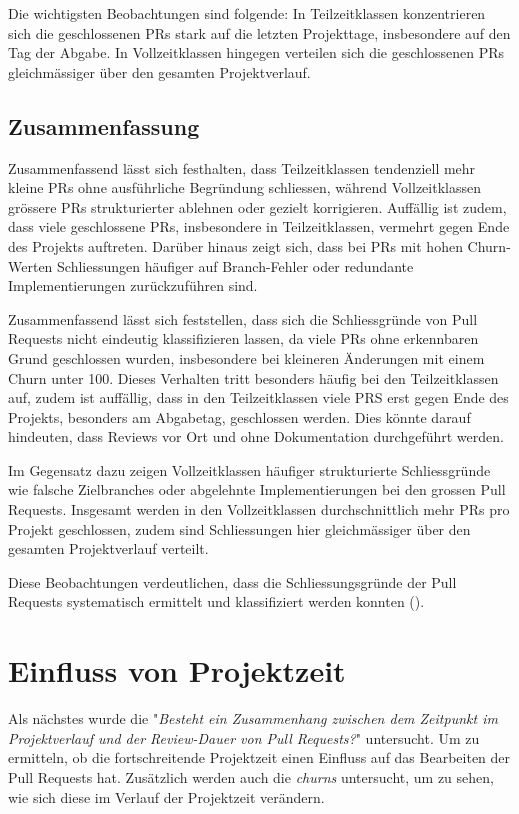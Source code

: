 Die wichtigsten Beobachtungen sind folgende: In Teilzeitklassen konzentrieren sich die geschlossenen PRs stark auf die letzten Projekttage, insbesondere auf den Tag der Abgabe. In Vollzeitklassen hingegen verteilen sich die geschlossenen PRs gleichmässiger über den gesamten Projektverlauf.


\subsection{Zusammenfassung}

Zusammenfassend lässt sich festhalten, dass Teilzeitklassen tendenziell mehr kleine PRs ohne ausführliche Begründung schliessen, während Vollzeitklassen grössere PRs strukturierter ablehnen oder gezielt korrigieren. Auffällig ist zudem, dass viele geschlossene PRs, insbesondere in Teilzeitklassen, vermehrt gegen Ende des Projekts auftreten. Darüber hinaus zeigt sich, dass bei PRs mit hohen Churn-Werten Schliessungen häufiger auf Branch-Fehler oder redundante Implementierungen zurückzuführen sind.

Zusammenfassend lässt sich feststellen, dass sich die Schliessgründe von Pull Requests nicht eindeutig klassifizieren lassen, da viele PRs ohne erkennbaren Grund geschlossen wurden, insbesondere bei kleineren Änderungen mit einem Churn unter 100. Dieses Verhalten tritt besonders häufig bei den Teilzeitklassen auf, zudem ist auffällig, dass in den Teilzeitklassen viele PRS  erst gegen Ende des Projekts, besonders am Abgabetag, geschlossen werden. Dies könnte darauf hindeuten, dass Reviews vor Ort und ohne Dokumentation durchgeführt werden.

Im Gegensatz dazu zeigen Vollzeitklassen häufiger strukturierte Schliessgründe wie falsche Zielbranches oder abgelehnte Implementierungen bei den grossen Pull Requests. Insgesamt werden in den Vollzeitklassen durchschnittlich mehr PRs pro Projekt geschlossen, zudem sind Schliessungen hier gleichmässiger über den gesamten Projektverlauf verteilt.

Diese Beobachtungen verdeutlichen, dass die Schliessungsgründe der Pull Requests systematisch ermittelt und klassifiziert werden konnten ().

\section{Einfluss von Projektzeit}
Als nächstes wurde die  "\textit{Besteht ein Zusammenhang zwischen dem Zeitpunkt im Projektverlauf und der Review-Dauer von Pull Requests?}" untersucht. Um zu ermitteln, ob die fortschreitende Projektzeit einen Einfluss auf das Bearbeiten der Pull Requests hat. Zusätzlich werden auch die \textit{churns} untersucht, um zu sehen, wie sich diese im Verlauf der Projektzeit verändern. 



